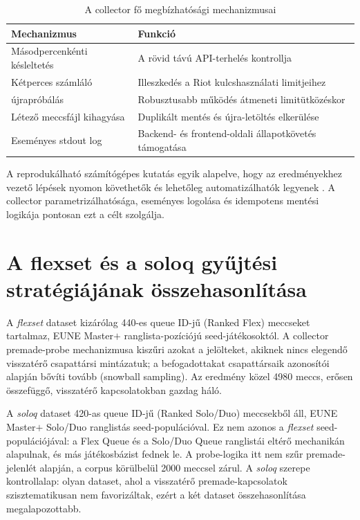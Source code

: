 \begin{table}[H]
\centering
\caption{A collector fő megbízhatósági mechanizmusai}
\begin{tabularx}{\textwidth}{>{\raggedright\arraybackslash}p{4.4cm}|X}
\toprule
\textbf{Mechanizmus} & \textbf{Funkció} \\
\midrule
Másodpercenkénti késleltetés & A rövid távú API-terhelés kontrollja \\
Kétperces számláló & Illeszkedés a Riot kulcshasználati limitjeihez \\
429 újrapróbálás & Robusztusabb működés átmeneti limitütközéskor \\
Létező meccsfájl kihagyása & Duplikált mentés és újra-letöltés elkerülése \\
Eseményes stdout log & Backend- és frontend-oldali állapotkövetés támogatása \\
\bottomrule
\end{tabularx}
\end{table}

A reprodukálható számítógépes kutatás egyik alapelve, hogy az eredményekhez vezető lépések nyomon követhetők és lehetőleg automatizálhatók legyenek \cite{sandve2013}. A collector parametrizálhatósága, eseményes logolása és idempotens mentési logikája pontosan ezt a célt szolgálja.

\section{A flexset és a soloq gyűjtési stratégiájának összehasonlítása}

A \textit{flexset} dataset kizárólag 440-es queue ID-jű (Ranked Flex) meccseket tartalmaz, EUNE Master$+$ ranglista-pozíciójú seed-játékosoktól. A collector premade-probe mechanizmusa kiszűri azokat a jelölteket, akiknek nincs elegendő visszatérő csapattársi mintázatuk; a befogadottakat csapattársaik azonosítói alapján bővíti tovább (snowball sampling). Az eredmény közel 4980 meccs, erősen összefüggő, visszatérő kapcsolatokban gazdag háló.

A \textit{soloq} dataset 420-as queue ID-jű (Ranked Solo/Duo) meccsekből áll, EUNE Master$+$ Solo/Duo ranglistás seed-populációval. Ez nem azonos a \textit{flexset} seed-populációjával: a Flex Queue és a Solo/Duo Queue ranglistái eltérő mechanikán alapulnak, és más játékosbázist fednek le. A probe-logika itt nem szűr premade-jelenlét alapján, a corpus körülbelül 2000 meccsel zárul. A \textit{soloq} szerepe kontrollalap: olyan dataset, ahol a visszatérő premade-kapcsolatok szisztematikusan nem favorizáltak, ezért a két dataset összehasonlítása megalapozottabb.

